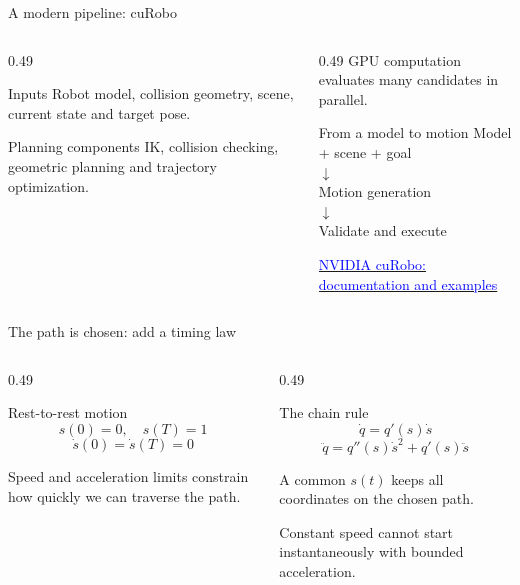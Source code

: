 \documentclass[aspectratio=169]{beamer}
\begin{document}
\begin{frame}[t]{A modern pipeline: cuRobo}
    \small
    \begin{columns}[T,onlytextwidth]
        \begin{column}{0.49\textwidth}
            \begin{block}{Inputs}
                Robot model, collision geometry, scene, current state and target pose.
            \end{block}
            \begin{block}{Planning components}
                IK, collision checking, geometric planning and trajectory optimization.
            \end{block}
        \end{column}
        \begin{column}{0.49\textwidth}
            GPU computation evaluates many candidates in parallel.
            \begin{block}{From a model to motion}
                Model + scene + goal\\
                $\downarrow$\\
                Motion generation\\
                $\downarrow$\\
                Validate and execute
            \end{block}
            \href{https://curobo.org/}{\textcolor{blue}{NVIDIA cuRobo: documentation and examples}}
        \end{column}
    \end{columns}
\end{frame}

\begin{frame}[t]{The path is chosen: add a timing law}
    \small
    \begin{columns}[T,onlytextwidth]
        \begin{column}{0.49\textwidth}
            \begin{block}{Rest-to-rest motion}
                \[s(0)=0,\quad s(T)=1\]
                \[\dot s(0)=\dot s(T)=0\]
            \end{block}
            Speed and acceleration limits constrain how quickly we can traverse the path.
        \end{column}
        \begin{column}{0.49\textwidth}
            \begin{block}{The chain rule}
                \[\dot q=q'(s)\dot s\]
                \[\ddot q=q''(s)\dot s^2+q'(s)\ddot s\]
            \end{block}
            A common $s(t)$ keeps all coordinates on the chosen path.
            \medskip

            Constant speed cannot start instantaneously with bounded acceleration.
        \end{column}
    \end{columns}
\end{frame}
\end{document}
